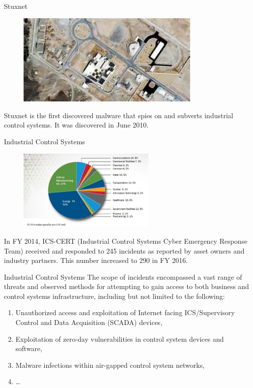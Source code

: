 \documentclass[10pt]{beamer}
\begin{document}
\begin{frame}{Stuxnet}
  \begin{figure}[ht]
    \centering
    \includegraphics[width=0.8\textwidth]{stuxnet.jpg}
  \end{figure}
  Stuxnet is the first discovered malware that spies on and subverts industrial control systems. It was discovered in June 2010. 
\end{frame}

\begin{frame}{Industrial Control Systems}
  \begin{figure}[ht]
    \centering
    \includegraphics[width=0.6\textwidth]{cert.jpg}
  \end{figure}
 In FY 2014, ICS-CERT (Industrial Control Systems Cyber Emergency Response Team) received and responded to 245 incidents as reported by asset owners and industry partners. This number increased to 290 in FY 2016.
\end{frame}


\begin{frame}{Industrial Control Systems}
   The scope of incidents encompassed a vast range of threats and observed methods for attempting to gain access to both business and control systems infrastructure, including but not limited to the following:
  \begin{enumerate}
  \item  Unauthorized access and exploitation of Internet facing ICS/Supervisory Control and Data Acquisition (SCADA) devices,
  \item 	 Exploitation of zero-day vulnerabilities in control system devices and software, 
  \item  	 Malware infections within air-gapped control system networks,
  \item \dots
  \end{enumerate}

\end{frame}
\end{document}
